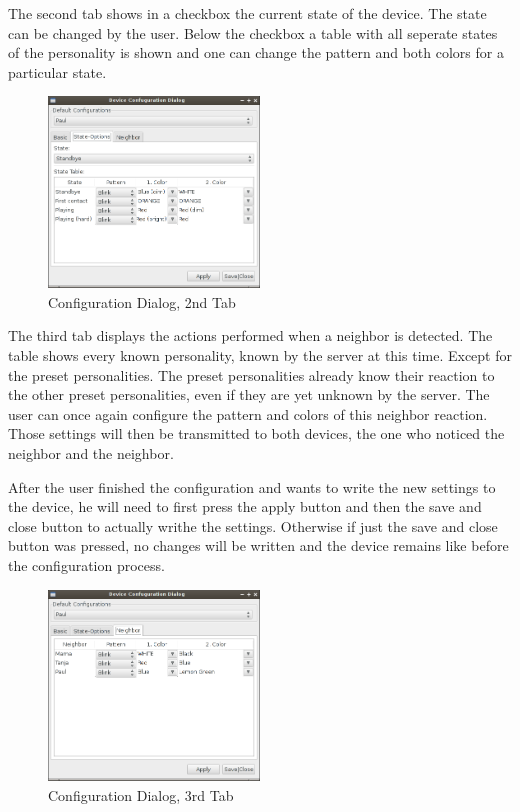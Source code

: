 The second tab shows in a checkbox the current state of the device. The state can be changed by the user. Below the checkbox a table with all seperate states of the personality is shown and one can change the pattern and both colors for a particular state. 


\begin{figure}[h!]
 \centering
 \includegraphics[width= 0.5\textwidth, clip=true  ,keepaspectratio=true]{./pic/java-server-config02.png}
 \caption{Configuration Dialog, 2nd Tab}
 \label{fig:java-server-config02}
\end{figure}


The third tab displays the actions performed when a neighbor is detected. The table shows every known personality, known by the server at this time. Except for the preset personalities. The preset personalities already know their reaction to the other preset personalities, even if they are yet unknown by the server.
The user can once again configure the pattern and colors of this neighbor reaction. Those settings will then be transmitted to both devices, the one who noticed the neighbor and the neighbor.

After the user finished the configuration and wants to write the new settings to the device, he will need to first press the apply button and then the save and close button to actually writhe the settings. Otherwise if just the save and close button was pressed, no changes will be written and the device remains like before the configuration process.
\begin{figure}[h!]
 \centering
 \includegraphics[width= 0.5\textwidth, clip=true  ,keepaspectratio=true]{./pic/java-server-config03.png}
 \caption{Configuration Dialog, 3rd Tab}
 \label{fig:java-server-config03}
\end{figure}

